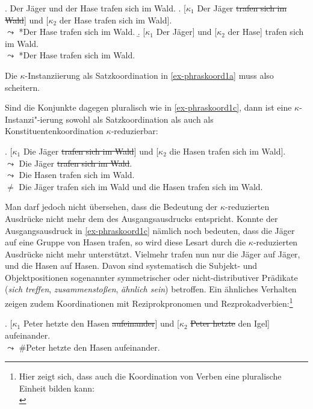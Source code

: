 \exi. \label{ex-phraskoord1} Der Jäger und der Hase trafen sich im Wald.
\a. \label{ex-phraskoord1a} [$\kappa_1$ Der Jäger \sout{trafen sich im Wald}] und [$\kappa_2$ der Hase trafen sich im Wald].\\
$\leadsto$ *Der Hase trafen sich im Wald.
\b. \label{ex-phraskoord1b} [$\kappa_1$ Der Jäger] und [$\kappa_2$ der Hase] trafen sich im Wald. \\
$\leadsto$ *Der Hase trafen sich im Wald.

Die $\kappa$-Instanziierung als Satzkoordination in \ref{ex-phraskoord1a} muss also scheitern.

Sind die Konjunkte dagegen pluralisch wie in \ref{ex-phraskoord1c}, dann ist eine $\kappa$-Instanzi"-ierung sowohl als Satzkoordination als auch als Konstituentenkoordination $\kappa$-reduzierbar: 

\ex. \label{ex-phraskoord1c} [$\kappa_1$ Die Jäger \sout{trafen sich im Wald}] und [$\kappa_2$ die Hasen trafen sich im Wald].\\
$\leadsto$ Die Jäger \sout{trafen sich im Wald}. \\ 
$\leadsto$ Die Hasen trafen sich im Wald. \\
$\neq$ Die Jäger trafen sich im Wald und die Hasen trafen sich im Wald.

Man darf jedoch nicht übersehen, dass die Bedeutung der $\kappa$-reduzierten Ausdrücke nicht mehr dem des Ausgangsausdrucks entspricht. Konnte der Ausgangsausdruck in \ref{ex-phraskoord1c} nämlich noch bedeuten, dass die Jäger auf eine Gruppe von Hasen trafen, so wird diese Lesart durch die $\kappa$-reduzierten Ausdrücke nicht mehr unterstützt. Vielmehr trafen nun nur die Jäger auf Jäger, und die Hasen auf Hasen. Davon sind systematisch die Subjekt- und Objektpositionen sogenannter symmetrischer oder nicht-distributiver Prädikate ({\it sich treffen}, {\it zusammensto\ss en}, {\it ähnlich sein}) betroffen. Ein ähnliches Verhalten zeigen zudem Koordinationen mit Reziprokpronomen und Rezprokadverbien:\footnote{Hier zeigt sich, dass auch die Koordination von Verben eine pluralische Einheit bilden kann:\\
} 

\ex. \label{ex-phraskoord2}
[$\kappa_1$ Peter hetzte den Hasen \sout{aufeinander}] und [$\kappa_2$ \sout{Peter hetzte} den Igel] aufeinander.\\
$\leadsto$ \#Peter hetzte den Hasen aufeinander. 

